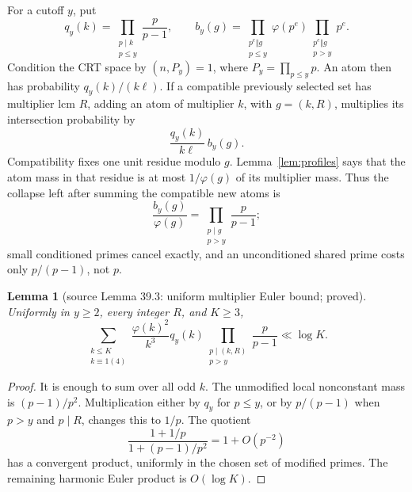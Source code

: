 \documentclass[10pt,reqno]{amsart}
\newtheorem{lemma}[theorem]{Lemma}
\theoremstyle{definition}
\newcommand{\1}{\mathbf 1}
\begin{document}
For a cutoff $y$, put
\begin{equation}\tag{39.13}
 q_y(k)=\prod_{\substack{p\mid k\\p\leq y}}\frac p{p-1},
 \qquad
 b_y(g)=\prod_{\substack{p^e\Vert g\\p\leq y}}\varphi(p^e)
         \prod_{\substack{p^e\Vert g\\p>y}}p^e.
\end{equation}
Condition the CRT space by $(n,P_y)=1$, where $P_y=\prod_{p\leq y}p$.
An atom then has probability $q_y(k)/(k\ell)$.  If a compatible previously
selected set has multiplier lcm $R$, adding an atom of multiplier $k$, with
$g=(k,R)$, multiplies its intersection probability by
\begin{equation}\tag{39.14}
 \frac{q_y(k)}{k\ell}\,b_y(g).
\end{equation}
Compatibility fixes one unit residue modulo $g$.  Lemma~\ref{lem:profiles}
says that the atom mass in that residue is at most $1/\varphi(g)$ of its
multiplier mass.  Thus the collapse left after summing the compatible new
atoms is
\begin{equation}\tag{39.15}
 \frac{b_y(g)}{\varphi(g)}
 =\prod_{\substack{p\mid g\\p>y}}\frac p{p-1};
\end{equation}
small conditioned primes cancel exactly, and an unconditioned shared prime
costs only $p/(p-1)$, not $p$.

\begin{lemma}[source Lemma 39.3: uniform multiplier Euler bound; proved]
\label{lem:euler-bound}
Uniformly in $y\geq2$, every integer $R$, and $K\geq3$,
\begin{equation}\tag{39.16}
 \sum_{\substack{k\leq K\\k\equiv1(4)}}
 \frac{\varphi(k)^2}{k^3}q_y(k)
 \prod_{\substack{p\mid(k,R)\\p>y}}\frac p{p-1}
 \ll\log K.
\end{equation}
\end{lemma}
\begin{proof}
It is enough to sum over all odd $k$.  The unmodified local nonconstant mass
is $(p-1)/p^2$.  Multiplication either by $q_y$ for $p\leq y$, or by
$p/(p-1)$ when $p>y$ and $p\mid R$, changes this to $1/p$.  The quotient
\begin{equation}\tag{39.17}
 \frac{1+1/p}{1+(p-1)/p^2}=1+O(p^{-2})
\end{equation}
has a convergent product, uniformly in the chosen set of modified primes.
The remaining harmonic Euler product is $O(\log K)$.
\end{proof}
\end{document}
